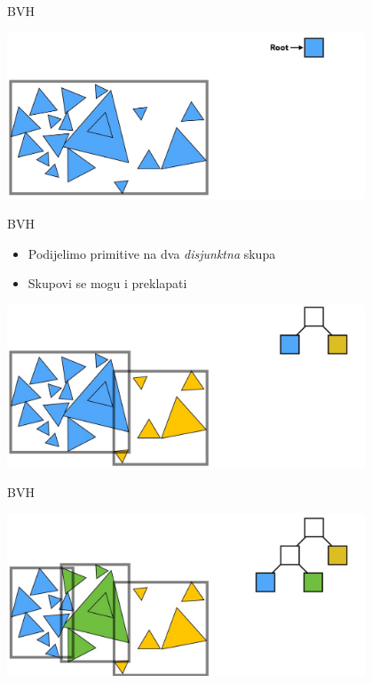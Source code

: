 \documentclass[9pt]{beamer}
\begin{document}
\begin{frame}{BVH}
	\begin{center}
		\includegraphics[width=0.8\textwidth]{slike/slide_016.jpg}
	\end{center}
\end{frame}
\begin{frame}{BVH}
	\begin{itemize}
		\item Podijelimo primitive na dva \textit{disjunktna} skupa
		\item Skupovi se mogu i preklapati
	\end{itemize}
	\begin{center}
		\includegraphics[width=0.8\textwidth]{slike/slide_017.jpg}
	\end{center}
\end{frame}
\begin{frame}{BVH}
	\begin{center}
		\includegraphics[width=0.8\textwidth]{slike/slide_018.jpg}
	\end{center}
\end{frame}
\end{document}
